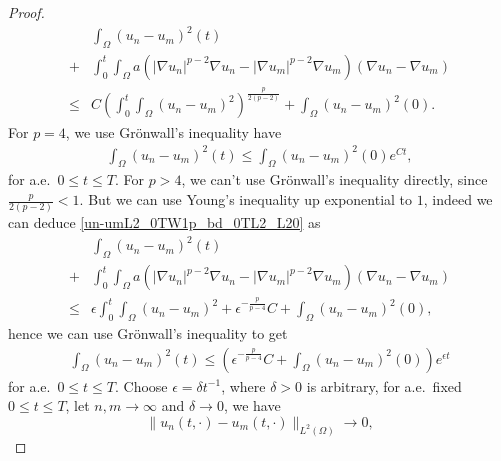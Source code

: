 \documentclass[11pt]{amsart}
\theoremstyle{definition}
\numberwithin{equation}{section}
\newcommand*\abs[1]{\lvert#1\rvert}
\newcommand*\norm[1]{\lVert#1\rVert}
\begin{document}
\begin{proof}
\begin{equation}
		\begin{split}
			& \int_{\Omega}\left(u_n-u_m\right)^2(t)\\
			+{} & \int_{0}^{t}\int_{\Omega}a
			\left(\abs{\nabla u_n}^{p-2}\nabla u_n
			- \abs{\nabla u_m}^{p-2}\nabla u_m\right)
			\left(\nabla u_n - \nabla u_m\right)\\
			\leq{} & C\left(\int_0^t\int_{\Omega}
			\left(u_n-u_m\right)^2\right)^{\frac{p}{2(p-2)}}
			+ \int_{\Omega}\left(u_n-u_m\right)^2(0).
		\end{split}
	\end{equation}
	For $p=4$, we use Gr\"onwall's inequality have
	\begin{equation}
		\begin{split}
			\int_{\Omega}\left( u_n-u_m \right)^2(t)
			\leq \int_{\Omega}\left(u_n-u_m\right)^2(0)e^{Ct} ,
		\end{split}
	\end{equation}
	for a.e.\ $0 \leq t \leq T$. For $p>4$,
	we can't use Gr\"onwall's inequality directly,
	since $\frac{p}{2(p-2)}<1$. But we can use Young's inequality up
	exponential to $1$,
	indeed we can deduce \cref{un-umL2_0TW1p_bd_0TL2_L20} as
	\begin{equation}
		\begin{split}
			& \int_{\Omega}\left(u_n-u_m\right)^2(t)\\
			+{} & \int_{0}^{t}\int_{\Omega}a
			\left(\abs{\nabla u_n}^{p-2}\nabla u_n
			- \abs{\nabla u_m}^{p-2}\nabla u_m\right)
			\left(\nabla u_n - \nabla u_m\right)\\
			\leq{} & \epsilon\int_0^t\int_{\Omega}
			\left(u_n-u_m\right)^2
			+ \epsilon^{-\frac{p}{p-4}}C
			+ \int_{\Omega}\left(u_n-u_m\right)^2(0),
		\end{split}
	\end{equation}
	hence we can use Gr\"onwall's inequality to get
	\begin{equation}\label{un-umL2_gronwall}
		\begin{split}
			\int_{\Omega}\left( u_n-u_m \right)^2(t)
			\leq \left( 
				\epsilon^{-\frac{p}{p-4}}C
				+ \int_{\Omega}\left(u_n-u_m\right)^2(0)
				\right)e^{\epsilon t}
		\end{split}
	\end{equation}
	for a.e.\ $0 \leq t \leq T$. Choose $\epsilon = \delta t^{-1}$,
	where $\delta > 0$ is arbitrary, for a.e.\ fixed $0 \leq t \leq T$,
	let $n,m \to \infty$ and $\delta \to 0$, we have
	\begin{equation}\label{cauchy_in_L2}
		\norm{u_n(t,\cdot)-u_m(t,\cdot)}_{L^2(\Omega)} \to 0,

\end{equation}
\end{proof}
\end{document}
